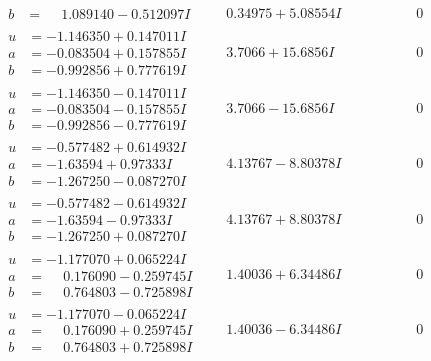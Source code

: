 \documentclass[1p]{elsarticle_modified}
\theoremstyle{definition}
\begin{document}
$$\begin{array}{c|c|c}
\begin{aligned}
b &= \phantom{-}1.089140 - 0.512097 I\end{aligned}
 & \phantom{-}0.34975 + 5.08554 I & \phantom{-0.000000 } 0 \\ \hline\begin{aligned}
u &= -1.146350 + 0.147011 I \\
a &= -0.083504 + 0.157855 I \\
b &= -0.992856 + 0.777619 I\end{aligned}
 & \phantom{-}3.7066 + 15.6856 I & \phantom{-0.000000 } 0 \\ \hline\begin{aligned}
u &= -1.146350 - 0.147011 I \\
a &= -0.083504 - 0.157855 I \\
b &= -0.992856 - 0.777619 I\end{aligned}
 & \phantom{-}3.7066 - 15.6856 I & \phantom{-0.000000 } 0 \\ \hline\begin{aligned}
u &= -0.577482 + 0.614932 I \\
a &= -1.63594 + 0.97333 I \\
b &= -1.267250 - 0.087270 I\end{aligned}
 & \phantom{-}4.13767 - 8.80378 I & \phantom{-0.000000 } 0 \\ \hline\begin{aligned}
u &= -0.577482 - 0.614932 I \\
a &= -1.63594 - 0.97333 I \\
b &= -1.267250 + 0.087270 I\end{aligned}
 & \phantom{-}4.13767 + 8.80378 I & \phantom{-0.000000 } 0 \\ \hline\begin{aligned}
u &= -1.177070 + 0.065224 I \\
a &= \phantom{-}0.176090 - 0.259745 I \\
b &= \phantom{-}0.764803 - 0.725898 I\end{aligned}
 & \phantom{-}1.40036 + 6.34486 I & \phantom{-0.000000 } 0 \\ \hline\begin{aligned}
u &= -1.177070 - 0.065224 I \\
a &= \phantom{-}0.176090 + 0.259745 I \\
b &= \phantom{-}0.764803 + 0.725898 I\end{aligned}
 & \phantom{-}1.40036 - 6.34486 I & \phantom{-0.000000 } 0 \\ \hline\begin{aligned}

\end{aligned}
\end{array}$$
\end{document}
